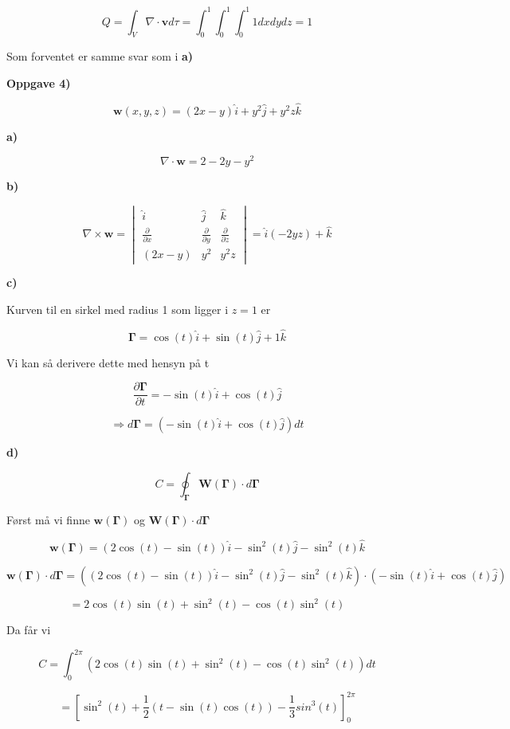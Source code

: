 \documentclass[a4paper,norsk,11pt,twoside]{article}
\begin{document}
$$
Q = \int_V \nabla \cdot \textbf{v} d\tau = \int_0 ^{1} \int_0 ^{1} \int_0 ^{1} 1 dxdydz = 1
$$

Som forventet er samme svar som i \textbf{a)}


\textbf{Oppgave 4)}

$$
\textbf{w}(x,y,z) = (2x -y)\hat{i} + y^{2}\hat{j} + y^{2}z\hat{k}
$$

\textbf{a)}

$$
\nabla \cdot \textbf{w} = 2 - 2y - y^{2}
$$

\textbf{b)}

$$
\nabla \times \textbf{w} 
=\begin{vmatrix}
\hat i & \hat j & \hat k \\
\frac{\partial}{\partial x} & \frac{\partial}{\partial y} & \frac{\partial}{\partial z} \\
(2x -y) & y^{2} & y^{2}z
\end{vmatrix}
= \hat{i}(-2yz) + \hat{k}
$$


\textbf{c)}

Kurven til en sirkel med radius 1 som ligger i $z = 1$ er

$$
\bm{\Gamma } = \cos(t)\hat{i} + \sin(t)\hat{j} + 1\hat{k}
$$

Vi kan så derivere dette med hensyn på t

$$
\frac{\partial \bm{\Gamma}}{\partial t} = -\sin(t) \hat i + \cos(t) \hat j
$$

$$
\Rightarrow d\bm{\Gamma} =  (-\sin(t) \hat i + \cos(t) \hat j)dt
$$

\textbf{d)}

$$
C = \oint_{\bm{\Gamma}} \bm{W}(\bm{\Gamma}) \cdot d\bm{\Gamma}
$$

Først må vi finne $\bm{w}(\bm{\Gamma})$ og $\bm{W}(\bm{\Gamma}) \cdot d\bm{\Gamma}$

$$
\bm{w}(\bm{\Gamma}) = (2\cos(t) - \sin(t))\hat{i} - \sin^{2}(t)\hat{j} - \sin^{2}(t)\hat{k}
$$

$$
\bm{w}(\bm{\Gamma}) \cdot d\bm{\Gamma} = ((2\cos(t) - \sin(t))\hat{i} - \sin^{2}(t)\hat{j} - \sin^{2}(t)\hat{k}) \cdot (-\sin(t) \hat i + \cos(t) \hat j)
$$

$$
= 2\cos(t)\sin(t) + \sin^{2}(t) - \cos(t)\sin^{2}(t)
$$

Da får vi

$$
C = \int_0^{2\pi} (2\cos(t)\sin(t) + \sin^{2}(t) - \cos(t)\sin^{2}(t)) dt
$$

$$
= \left[\sin^{2}(t) + \frac{1}{2}(t-\sin(t)\cos(t)) - \frac{1}{3}sin^{3}(t)\right]_0^{2\pi}
$$
\end{document}
